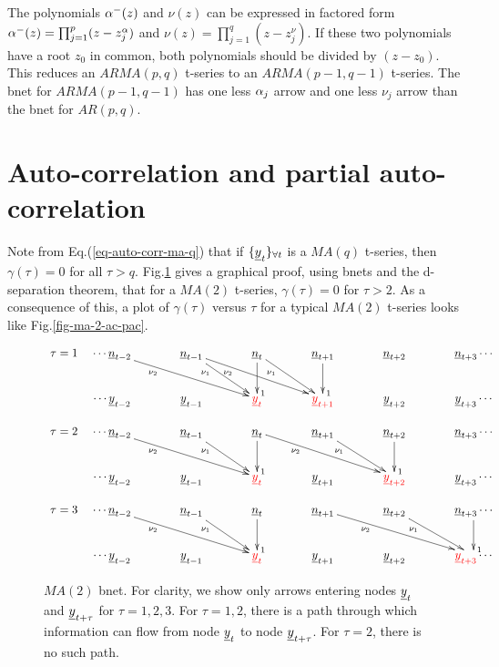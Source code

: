 The polynomials $\alpha^-(z)$
and $\nu(z)$ can be expressed 
in factored form $\alpha^-(z)=
\prod_{j=1}^{p}(z-z^\alpha_j)$
and 
$\nu(z)=
\prod_{j=1}^{q}(z-z^\nu_j)$.
If these two polynomials have
a root $z_0$ in common,
both polynomials should
be divided by $(z-z_0)$.
This reduces an $ARMA(p,q)$
t-series to an $ARMA(p-1, q-1)$
t-series.
The bnet for
$ARMA(p-1, q-1)$
has one less $\alpha_j$ arrow
and one less $\nu_j$ arrow
than the bnet
for $AR(p,q)$.



\section{Auto-correlation
and partial auto-correlation}

Note
from Eq.(\ref{eq-auto-corr-ma-q})
 that if
${\{{\underline{y}}_t\}_{\forall t}}$
is a $MA(q)$ t-series, then
$\gamma(\tau)=0$  for all $\tau>q$.
Fig.\ref{fig-ma-2-tau-123}
gives a graphical proof,
using
bnets and the
d-separation
theorem,
that 
for a $MA(2)$
t-series, $\gamma(\tau)=0$
for $\tau>2$.
As a consequence of this,
a plot of $\gamma(\tau)$
versus $\tau$
for a typical $MA(2)$
t-series looks like Fig.\ref{fig-ma-2-ac-pac}.
 


\begin{figure}[h!]
$$
\begin{array}{ll}
\tau=1&
\xymatrix@C=36px{
\cdots
\rvn_{t-2}\ar[drr]_(.3){\nu_2}
&\rvn_{t-1}\ar[dr]_(.3){\nu_1}
\ar[drr]_(.3){\nu_2}
&\rvn_t\ar[d]^>1
\ar[dr]_(.3){\nu_1}
&\rvn_{t+1}\ar[d]^>1
&\rvn_{t+2}
&\rvn_{t+3}
\cdots
\\
\cdots
\rvy_{t-2}
&\rvy_{t-1}
&{\color{red}\rvy_t}
&{\color{red}\rvy_{t+1}}
&\rvy_{t+2}
&\rvy_{t+3}
\cdots
}
\\
\\
\tau=2&
\xymatrix@C=36px{
\cdots
\rvn_{t-2}\ar[drr]_(.3){\nu_2}
&\rvn_{t-1}\ar[dr]_(.3){\nu_1}
&\rvn_t\ar[drr]_(.3){\nu_2}
\ar[d]^>1
&\rvn_{t+1}\ar[dr]_(.3){\nu_1}
&\rvn_{t+2}\ar[d]^>1
&\rvn_{t+3}
\cdots
\\
\cdots
\rvy_{t-2}
&\rvy_{t-1}
&{\color{red}\rvy_t}
&{\rvy_{t+1}}
&{\color{red}\rvy_{t+2}}
&\rvy_{t+3}
\cdots
}
\\
\\
\tau=3&
\xymatrix@C=36px{
\cdots
\rvn_{t-2}\ar[drr]_(.3){\nu_2}
&\rvn_{t-1}\ar[dr]_(.3){\nu_1}
&\rvn_t\ar[d]^>1
&\rvn_{t+1}\ar[drr]_(.3){\nu_2}
&\rvn_{t+2}\ar[dr]_(.3){\nu_1}
&\rvn_{t+3}\ar[d]^>1
\cdots
\\
\cdots
\rvy_{t-2}
&\rvy_{t-1}
&{\color{red}\rvy_t}
&{\rvy_{t+1}}
&{\rvy_{t+2}}
&{\color{red}\rvy_{t+3}}
\cdots
}
\end{array}
$$
\caption{$MA(2)$ bnet.
For clarity, we show only arrows 
entering nodes
${\underline{y}}_t$ and ${\underline{y}}_{t+\tau}$
for $\tau=1,2,3$.
For $\tau=1,2$, there is a path 
through which
information can flow
from node ${\underline{y}}_t$
to node ${\underline{y}}_{t+\tau}$.
For $\tau=2$, there is no such path.
}
\label{fig-ma-2-tau-123}
\end{figure}

